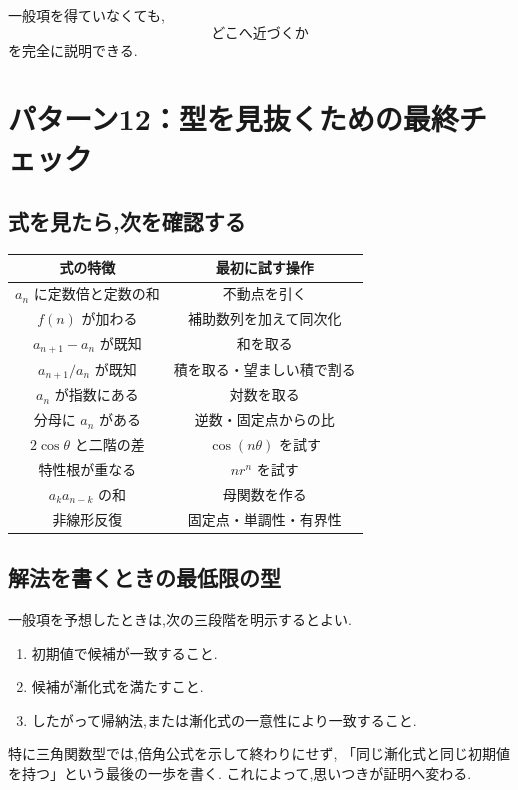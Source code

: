 一般項を得ていなくても,
\[
  \text{どこへ近づくか}
\]
を完全に説明できる.

\section{パターン12：型を見抜くための最終チェック}

\subsection{式を見たら,次を確認する}

\begin{center}
\begin{tabular}{c|c}
  式の特徴 & 最初に試す操作\\ \hline
  $a_n$ に定数倍と定数の和 & 不動点を引く\\
  $f(n)$ が加わる & 補助数列を加えて同次化\\
  $a_{n+1}-a_n$ が既知 & 和を取る\\
  $a_{n+1}/a_n$ が既知 & 積を取る・望ましい積で割る\\
  $a_n$ が指数にある & 対数を取る\\
  分母に $a_n$ がある & 逆数・固定点からの比\\
  $2\cos\theta$ と二階の差 & $\cos(n\theta)$ を試す\\
  特性根が重なる & $n r^n$ を試す\\
  $a_ka_{n-k}$ の和 & 母関数を作る\\
  非線形反復 & 固定点・単調性・有界性\\
\end{tabular}
\end{center}

\subsection{解法を書くときの最低限の型}

一般項を予想したときは,次の三段階を明示するとよい.

\begin{enumerate}
  \item 初期値で候補が一致すること.
  \item 候補が漸化式を満たすこと.
  \item したがって帰納法,または漸化式の一意性により一致すること.
\end{enumerate}

特に三角関数型では,倍角公式を示して終わりにせず,
「同じ漸化式と同じ初期値を持つ」という最後の一歩を書く.
これによって,思いつきが証明へ変わる.

